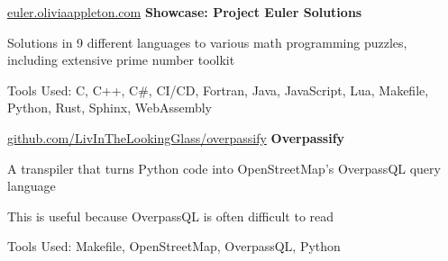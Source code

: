 	\vspace{0.2 cm}

	\begin{samepage}
		\begin{twocolentry}
			{ \href{https://euler.oliviaappleton.com}{euler.oliviaappleton.com} } \textbf{Showcase:
			Project Euler Solutions}
		\end{twocolentry}
	
		\begin{onecolentry}
			\begin{highlights}
				\item Solutions in 9 different languages to various math programming puzzles, including extensive prime number toolkit
				\item Tools Used: C, C+\!+, C\#, CI/CD, Fortran, Java, JavaScript, Lua,
				Makefile, Python, Rust, Sphinx, WebAssembly
			\end{highlights}
		\end{onecolentry}
	\end{samepage}

	\vspace{0.2 cm}

	\begin{samepage}
		\begin{twocolentry}
			{ \href{https://github.com/LivInTheLookingGlass/overpassify}{\hspace{-3 cm} \mbox{github.com/LivInTheLookingGlass/overpassify}} } \textbf{Overpassify}
		\end{twocolentry}
	
		\begin{onecolentry}
			\begin{highlights}
				\item A transpiler that turns Python code into OpenStreetMap's OverpassQL query language
				\item This is useful because OverpassQL is often difficult to read
				\item Tools Used: Makefile, OpenStreetMap, OverpassQL, Python
			\end{highlights}
		\end{onecolentry}
	\end{samepage}

	\vspace{0.2 cm}

